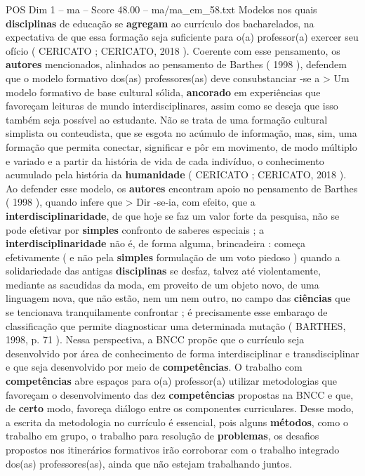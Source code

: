 \begin{textsample}{POS Dim 1 – ma – Score 48.00 – ma/ma\_em\_58.txt}
Modelos nos quais \textbf{disciplinas} de educação se \textbf{agregam} ao currículo dos bacharelados, na expectativa de que essa formação seja suficiente para o(a) professor(a) exercer seu ofício ( CERICATO ; CERICATO, 2018 ).
Coerente com esse pensamento, os \textbf{autores} mencionados, alinhados ao pensamento de Barthes ( 1998 ), defendem que o modelo formativo dos(as) professores(as) deve consubstanciar -se a > Um modelo formativo de base cultural sólida, \textbf{ancorado} em experiências que favoreçam leituras de mundo interdisciplinares, assim como se deseja que isso também seja possível ao estudante.
Não se trata de uma formação cultural simplista ou conteudista, que se esgota no acúmulo de informação, mas, sim, uma formação que permita conectar, significar e pôr em movimento, de modo múltiplo e variado e a partir da história de vida de cada indivíduo, o conhecimento acumulado pela história da \textbf{humanidade} ( CERICATO ; CERICATO, 2018 ).
Ao defender esse modelo, os \textbf{autores} encontram apoio no pensamento de Barthes ( 1998 ), quando infere que > Dir -se-ia, com efeito, que a \textbf{interdisciplinaridade}, de que hoje se faz um valor forte da pesquisa, não se pode efetivar por \textbf{simples} confronto de saberes especiais ; a \textbf{interdisciplinaridade} não é, de forma alguma, brincadeira : começa efetivamente ( e não pela \textbf{simples} formulação de um voto piedoso ) quando a solidariedade das antigas \textbf{disciplinas} se desfaz, talvez até violentamente, mediante as sacudidas da moda, em proveito de um objeto novo, de uma linguagem nova, que não estão, nem um nem outro, no campo das \textbf{ciências} que se tencionava tranquilamente confrontar ; é precisamente esse embaraço de classificação que permite diagnosticar uma determinada mutação ( BARTHES, 1998, p. 71 ).
Nessa perspectiva, a BNCC propõe que o currículo seja desenvolvido por área de conhecimento de forma interdisciplinar e transdisciplinar e que seja desenvolvido por meio de \textbf{competências}.
O trabalho com \textbf{competências} abre espaços para o(a) professor(a) utilizar metodologias que favoreçam o desenvolvimento das dez \textbf{competências} propostas na BNCC e que, de \textbf{certo} modo, favoreça diálogo entre os componentes curriculares.
Desse modo, a escrita da metodologia no currículo é essencial, pois alguns \textbf{métodos}, como o trabalho em grupo, o trabalho para resolução de \textbf{problemas}, os desafios propostos nos itinerários formativos irão corroborar com o trabalho integrado dos(as) professores(as), ainda que não estejam trabalhando juntos.

\end{textsample}
